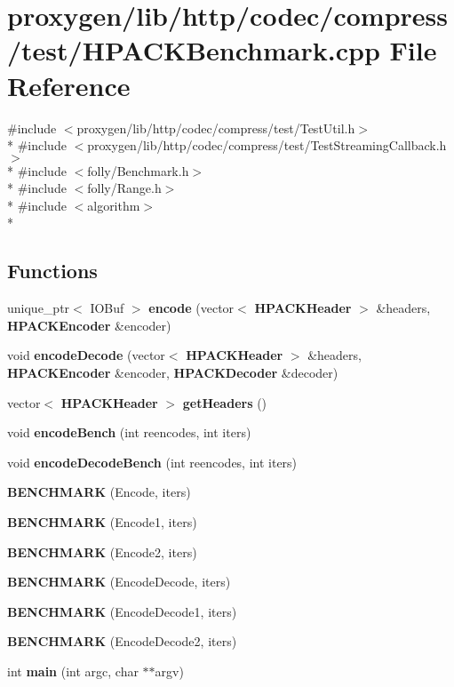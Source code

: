\section{proxygen/lib/http/codec/compress/test/\+H\+P\+A\+C\+K\+Benchmark.cpp File Reference}
\label{HPACKBenchmark_8cpp}
{\ttfamily \#include $<$proxygen/lib/http/codec/compress/test/\+Test\+Util.\+h$>$}\\*
{\ttfamily \#include $<$proxygen/lib/http/codec/compress/test/\+Test\+Streaming\+Callback.\+h$>$}\\*
{\ttfamily \#include $<$folly/\+Benchmark.\+h$>$}\\*
{\ttfamily \#include $<$folly/\+Range.\+h$>$}\\*
{\ttfamily \#include $<$algorithm$>$}\\*
\subsection*{Functions}
\begin{DoxyCompactItemize}
\item 
unique\+\_\+ptr$<$ I\+O\+Buf $>$ {\bf encode} (vector$<$ {\bf H\+P\+A\+C\+K\+Header} $>$ \&headers, {\bf H\+P\+A\+C\+K\+Encoder} \&encoder)
\item 
void {\bf encode\+Decode} (vector$<$ {\bf H\+P\+A\+C\+K\+Header} $>$ \&headers, {\bf H\+P\+A\+C\+K\+Encoder} \&encoder, {\bf H\+P\+A\+C\+K\+Decoder} \&decoder)
\item 
vector$<$ {\bf H\+P\+A\+C\+K\+Header} $>$ {\bf get\+Headers} ()
\item 
void {\bf encode\+Bench} (int reencodes, int iters)
\item 
void {\bf encode\+Decode\+Bench} (int reencodes, int iters)
\item 
{\bf B\+E\+N\+C\+H\+M\+A\+RK} (Encode, iters)
\item 
{\bf B\+E\+N\+C\+H\+M\+A\+RK} (Encode1, iters)
\item 
{\bf B\+E\+N\+C\+H\+M\+A\+RK} (Encode2, iters)
\item 
{\bf B\+E\+N\+C\+H\+M\+A\+RK} (Encode\+Decode, iters)
\item 
{\bf B\+E\+N\+C\+H\+M\+A\+RK} (Encode\+Decode1, iters)
\item 
{\bf B\+E\+N\+C\+H\+M\+A\+RK} (Encode\+Decode2, iters)
\item 
int {\bf main} (int argc, char $\ast$$\ast$argv)
\end{DoxyCompactItemize}



